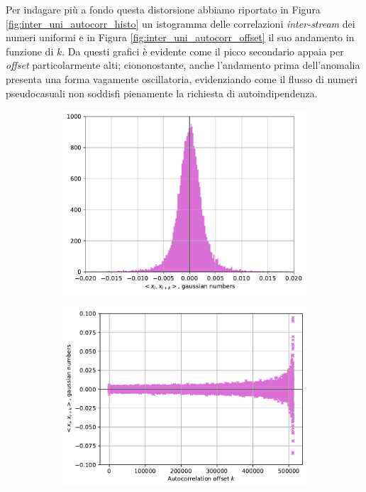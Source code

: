 Per indagare più a fondo questa distorsione abbiamo riportato in Figura \ref{fig:inter_uni_autocorr_histo} un istogramma delle correlazioni \textit{inter-stream} dei numeri uniformi e in Figura \ref{fig:inter_uni_autocorr_offset} il suo andamento in funzione di $k$. Da questi grafici è evidente come il picco secondario appaia per \textit{offset} particolarmente alti; ciononostante, anche l'andamento prima dell'anomalia presenta una forma vagamente oscillatoria, evidenziando come il flusso di numeri pseudocasuali non soddisfi pienamente la richiesta di autoindipendenza.

\begin{figure}[t]
\centering
\begin{subfigure}{.5\textwidth}
  \centering
  \includegraphics[scale=0.5]{graphs/CorrelationTests_GaussInterStreamAutocorrelationHistogram.pdf}
  \caption{}
  \label{fig:inter_gauss_autocorr_histo}
\end{subfigure}%
\begin{subfigure}{.5\textwidth}
  \centering
  \includegraphics[scale=0.5]{graphs/CorrelationTests_GaussInterStreamAutocorrelationVsOffset.pdf}

\end{subfigure}
\end{figure}
